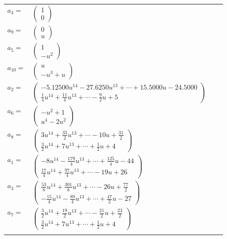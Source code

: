 \documentclass[1p]{elsarticle_modified}
\theoremstyle{definition}
\begin{document}
\begin{tabular}{m{7pt} m{180pt} m{7pt} m{180pt} }
\flushright $a_{4}=$&$\begin{pmatrix}1\\0\end{pmatrix}$ \\
\flushright $a_{9}=$&$\begin{pmatrix}0\\u\end{pmatrix}$ \\
\flushright $a_{5}=$&$\begin{pmatrix}1\\- u^2\end{pmatrix}$ \\
\flushright $a_{10}=$&$\begin{pmatrix}u\\- u^3+u\end{pmatrix}$ \\
\flushright $a_{2}=$&$\begin{pmatrix}-5.12500 u^{14}-27.6250 u^{13}+\cdots+15.5000 u-24.5000\\\frac{1}{4} u^{14}+\frac{11}{4} u^{13}+\cdots-\frac{9}{2} u+5\end{pmatrix}$ \\
\flushright $a_{6}=$&$\begin{pmatrix}- u^2+1\\u^4-2 u^2\end{pmatrix}$ \\
\flushright $a_{8}=$&$\begin{pmatrix}3 u^{14}+\frac{33}{2} u^{13}+\cdots-10 u+\frac{31}{2}\\\frac{3}{2} u^{14}+7 u^{13}+\cdots+\frac{1}{2} u+4\end{pmatrix}$ \\
\flushright $a_{1}=$&$\begin{pmatrix}-8 u^{14}-\frac{179}{4} u^{13}+\cdots+\frac{125}{4} u-44\\\frac{17}{4} u^{14}+\frac{97}{4} u^{13}+\cdots-19 u+26\end{pmatrix}$ \\
\flushright $a_{3}=$&$\begin{pmatrix}\frac{53}{8} u^{14}+\frac{301}{8} u^{13}+\cdots-26 u+\frac{77}{2}\\-\frac{15}{4} u^{14}-\frac{89}{4} u^{13}+\cdots+\frac{47}{2} u-27\end{pmatrix}$ \\
\flushright $a_{7}=$&$\begin{pmatrix}\frac{3}{2} u^{14}+\frac{19}{2} u^{13}+\cdots-\frac{21}{2} u+\frac{23}{2}\\\frac{3}{2} u^{14}+7 u^{13}+\cdots+\frac{1}{2} u+4\end{pmatrix}$\\&\end{tabular}
\end{document}
